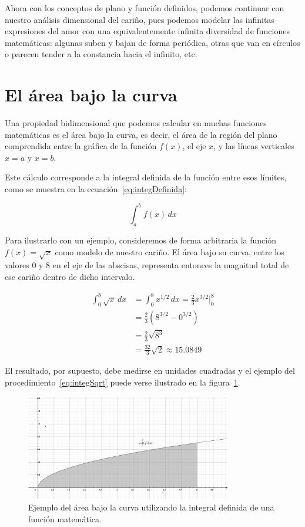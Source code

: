 \documentclass[12pt, oneside]{article}
\begin{document}
Ahora con los conceptos de plano y función definidos, podemos continuar con nuestro análisis dimensional del cariño, 
pues podemos modelar las infinitas expresiones del amor con una equivalentemente infinita diversidad de funciones 
matemáticas: algunas suben y bajan de forma periódica, otras que van en círculos o parecen tender a la constancia hacia
 el infinito, etc.

\section{El área bajo la curva}
Una propiedad bidimensional que podemos calcular en muchas funciones matemáticas es el área bajo la curva, es decir, 
el área de la región del plano comprendida entre la gráfica de la función $f(x)$, el eje $x$, y las líneas verticales 
$x = a$ y $x = b$.\cite{eswiki:integracion} 

Este cálculo corresponde a la integral definida de la función entre esos límites, como se muestra en la 
ecuación~\ref{eq:integDefinida}:

\begin{equation}
\label{eq:integDefinida}
\int_{a}^{b} f(x)\, dx
\end{equation}

Para ilustrarlo con un ejemplo, consideremos de forma arbitraria la función \mbox{$f(x) = \sqrt{x}$} como modelo de nuestro 
cariño. El área bajo su curva, entre los valores $0$ y $8$ en el eje de las abscisas, representa entonces la magnitud 
total de ese cariño dentro de dicho intervalo.

\begin{equation}
\begin{aligned}
\int_{0}^{8} \sqrt{x}\, dx &= \int_{0}^{8} x^{1/2}\, dx = \frac{2}{3}x^{3/2}\Big|_{0}^{8} \\[0.5em]
&= \frac{2}{3}(8^{3/2} - 0^{3/2}) \\[0.5em]
&= \frac{2}{3}\sqrt{8^3} \\[0.5em]
&= \frac{32}{3}\sqrt{2} \approx 15.0849
\end{aligned}
\label{eq:integSqrt}
\end{equation}

El resultado, por supuesto, debe medirse en unidades cuadradas y el ejemplo del procedimiento~\ref{eq:integSqrt}
puede verse ilustrado en la figura~\ref{fig:grafIntDef}.

\begin{figure}[h]
\centering
\includegraphics[width=0.8\textwidth]{grafIntDef.png}
\caption{Ejemplo del área bajo la curva utilizando la integral definida de una función matemática.}
\label{fig:grafIntDef} %
\end{figure}
\end{document}
